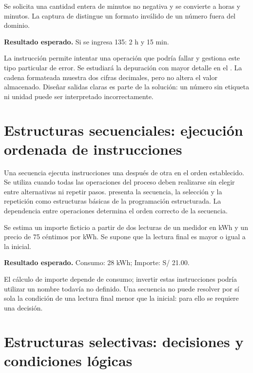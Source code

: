 
Se solicita una cantidad entera de minutos no negativa y se convierte a horas y minutos. La captura de  distingue un formato inválido de un número fuera del dominio.


\textbf{Resultado esperado.} Si se ingresa 135: 2 h y 15 min.

La instrucción  permite intentar una operación que podría fallar y   gestiona este tipo particular de error. Se estudiará la depuración con mayor detalle en el . La cadena formateada  muestra dos cifras decimales, pero no altera el valor almacenado. Diseñar salidas claras es parte de la solución: un número sin etiqueta ni unidad puede ser interpretado incorrectamente.

\section{Estructuras secuenciales: ejecución ordenada de instrucciones}

Una secuencia ejecuta instrucciones una después de otra en el orden establecido. Se utiliza cuando todas las operaciones del proceso deben realizarse sin elegir entre alternativas ni repetir pasos. \textcite[cap.~3]{farrell2013} presenta la secuencia, la selección y la repetición como estructuras básicas de la programación estructurada. La dependencia entre operaciones determina el orden correcto de la secuencia.


Se estima un importe ficticio a partir de dos lecturas de un medidor en kWh y un precio de 75 céntimos por kWh. Se supone que la lectura final es mayor o igual a la inicial.


\textbf{Resultado esperado.} Consumo: 28 kWh; Importe: S/ 21.00.



El cálculo de importe depende de consumo; invertir estas instrucciones podría utilizar un nombre todavía no definido. Una secuencia no puede resolver por sí sola la condición de una lectura final menor que la inicial: para ello se requiere una decisión.

\section{Estructuras selectivas: decisiones y condiciones lógicas}

